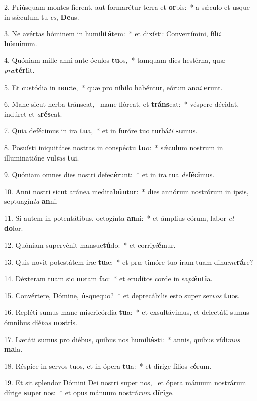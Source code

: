 2. Priúsquam montes fíerent, aut formarétur terra et \textbf{or}bis:~*  a sǽculo et usque in sǽculum tu \textit{es}, \textbf{De}us.\

3. Ne avértas hóminem in humili\textbf{tá}tem:~*  et dixísti: Convertímini, fíli\textit{i} \textbf{hó}\textbf{mi}num.\

4. Quóniam mille anni ante óculos \textbf{tu}os,~*  tamquam dies hestérna, quæ \textit{præ}\textbf{tér}\textbf{i}it.\

5. Et custódia in \textbf{noc}te,~*  quæ pro níhilo habéntur, eórum an\textit{ni} \textbf{e}runt.\

6. Mane sicut herba tránseat, \dag\  mane flóreat, et \textbf{tráns}eat:~*  véspere décidat, indúret et \textit{a}\textbf{rés}cat.\

7. Quia defécimus in ira \textbf{tu}a,~*  et in furóre tuo turbá\textit{ti} \textbf{su}mus.\

8. Posuísti iniquitátes nostras in conspéctu \textbf{tu}o:~*  sǽculum nostrum in illuminatióne vul\textit{tus} \textbf{tu}i.\

9. Quóniam omnes dies nostri defe\textbf{cé}runt:~*  et in ira tua \textit{de}\textbf{fé}\textbf{ci}mus.\

10. Anni nostri sicut aránea medita\textbf{bún}tur:~*  dies annórum nostrórum in ipsis, septuagín\textit{ta} \textbf{an}ni.\

11. Si autem in potentátibus, octogínta \textbf{an}ni:~*  et ámplius eórum, labor \textit{et} \textbf{do}lor.\

12. Quóniam supervénit mansue\textbf{tú}do:~*  et corri\textit{pi}\textbf{é}mur.\

13. Quis novit potestátem iræ \textbf{tu}æ:~*  et præ timóre tuo iram tuam dinu\textit{me}\textbf{rá}re?\

14. Déxteram tuam sic \textbf{no}tam fac:~*  et erudítos corde in sa\textit{pi}\textbf{én}\textbf{ti}a.\

15. Convértere, Dómine, \textbf{ús}quequo?~*  et deprecábilis esto super ser\textit{vos} \textbf{tu}os.\

16. Repléti sumus mane misericórdia \textbf{tu}a:~*  et exsultávimus, et delectáti sumus ómnibus dié\textit{bus} \textbf{nos}tris.\

17. Lætáti sumus pro diébus, quibus nos humili\textbf{ás}ti:~*  annis, quibus vídi\textit{mus} \textbf{ma}la.\

18. Réspice in servos tuos, et in ópera \textbf{tu}a:~*  et dírige fílios \textit{e}\textbf{ó}rum.\

19. Et sit splendor Dómini Dei nostri super nos, \dag\  et ópera mánuum nostrárum dírige \textbf{su}per nos:~*  et opus mánuum nostrá\textit{rum} \textbf{dí}\textbf{ri}ge.\

